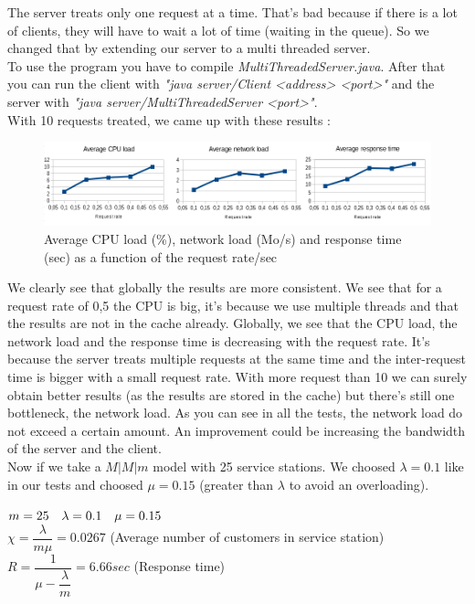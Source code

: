\documentclass[11pt,a4paper]{article}
\begin{document}
The server treats only one request at a time. That's bad because if there is a lot of clients, they will have to wait a lot of time (waiting in the queue). So we changed that by extending our server to a multi threaded server.\\
To use the program you have to compile \textit{MultiThreadedServer.java}. After that you can run the client with \textit{"java server/Client <address> <port>"} and the server with \textit{"java server/MultiThreadedServer <port>"}.\\

With 10 requests treated, we came up with these results :

\begin{figure}[h!]
\centering
\includegraphics[width=14cm]{measurement4.png}
\caption{Average CPU load (\%), network load (Mo/s) and response time (sec) as a function of the request rate/sec}
\end{figure}

We clearly see that globally the results are more consistent. We see that for a request rate of 0,5 the CPU is big, it's because we use multiple threads and that the results are not in the cache already. Globally, we see that the CPU load, the network load and the response time is decreasing with the request rate. It's because the server treats multiple requests at the same time and the inter-request time is bigger with a small request rate. With more request than 10 we can surely obtain better results (as the results are stored in the cache) but there's still one bottleneck, the network load. As you can see in all the tests, the network load do not exceed a certain amount. An improvement could be increasing the bandwidth of the server and the client.\\

Now if we take a $ M|M|m $ model with 25 service stations. We choosed $ \lambda = 0.1 $ like in our tests and choosed $ \mu = 0.15 $ (greater than $ \lambda $ to avoid an overloading).\\

\begin{center}
$ m = 25 \hspace{10px} \lambda = 0.1 \hspace{10px} \mu = 0.15 $\\
$ \chi = \dfrac{\lambda}{m\mu} = 0.0267 $ (Average number of customers in service station)\\
$ R = \dfrac{1}{\mu - \dfrac{\lambda}{m}} = 6.66 sec $ (Response time)
\end{center}
\end{document}
